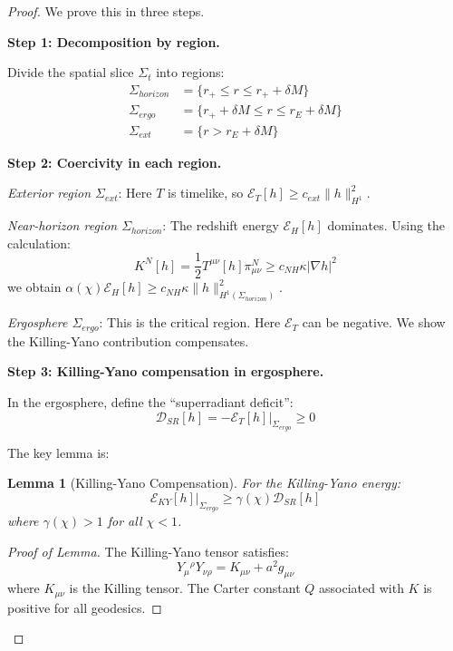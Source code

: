 \documentclass[12pt,a4paper]{article}
\newtheorem{lemma}[theorem]{Lemma}
\begin{document}
\begin{proof}
We prove this in three steps.

\textbf{Step 1: Decomposition by region.}

Divide the spatial slice $\Sigma_t$ into regions:
\begin{align}
\Sigma_{horizon} &= \{r_+ \leq r \leq r_+ + \delta M\} \\
\Sigma_{ergo} &= \{r_+ + \delta M \leq r \leq r_E + \delta M\} \\
\Sigma_{ext} &= \{r > r_E + \delta M\}
\end{align}

\textbf{Step 2: Coercivity in each region.}

\textit{Exterior region $\Sigma_{ext}$}: Here $T$ is timelike, so $\mathcal{E}_T[h] \geq c_{ext}\|h\|_{H^1}^2$.

\textit{Near-horizon region $\Sigma_{horizon}$}: The redshift energy $\mathcal{E}_H[h]$ dominates. Using the calculation:
\begin{equation}
K^N[h] = \frac{1}{2}T^{\mu\nu}[h]\pi^N_{\mu\nu} \geq c_{NH}\kappa |\nabla h|^2
\end{equation}
we obtain $\alpha(\chi)\mathcal{E}_H[h] \geq c_{NH}\kappa\|h\|_{H^1(\Sigma_{horizon})}^2$.

\textit{Ergosphere $\Sigma_{ergo}$}: This is the critical region. Here $\mathcal{E}_T$ can be negative. We show the Killing-Yano contribution compensates.

\textbf{Step 3: Killing-Yano compensation in ergosphere.}

In the ergosphere, define the ``superradiant deficit'':
\begin{equation}
\mathcal{D}_{SR}[h] = -\mathcal{E}_T[h]|_{\Sigma_{ergo}} \geq 0
\end{equation}

The key lemma is:

\begin{lemma}[Killing-Yano Compensation]
For the Killing-Yano energy:
\begin{equation}
\mathcal{E}_{KY}[h]|_{\Sigma_{ergo}} \geq \gamma(\chi) \mathcal{D}_{SR}[h]
\end{equation}
where $\gamma(\chi) > 1$ for all $\chi < 1$.
\end{lemma}

\begin{proof}[Proof of Lemma]
The Killing-Yano tensor satisfies:
\begin{equation}
Y_{\mu}{}^\rho Y_{\nu\rho} = K_{\mu\nu} + a^2 g_{\mu\nu}
\end{equation}
where $K_{\mu\nu}$ is the Killing tensor. The Carter constant $Q$ associated with $K$ is positive for all geodesics. 


\end{proof}
\end{proof}
\end{document}
